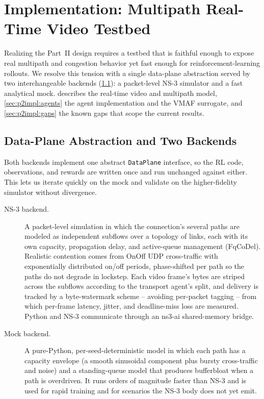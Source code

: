 \chapter{Implementation: Multipath Real-Time Video Testbed}
\label{ch:p2impl}

Realizing the Part~II design requires a testbed that is faithful enough to expose real multipath and
congestion behavior yet fast enough for reinforcement-learning rollouts. We resolve this tension with a
single data-plane abstraction served by two interchangeable backends (\cref{sec:p2impl:dataplane}): a
packet-level NS-3 simulator and a fast analytical mock.  describes the real-time
video and multipath model, \cref{sec:p2impl:agents} the agent implementation and the VMAF surrogate, and
\cref{sec:p2impl:gaps} the known gaps that scope the current results.

\section{Data-Plane Abstraction and Two Backends}
\label{sec:p2impl:dataplane}

Both backends implement one abstract \texttt{DataPlane} interface, so the RL code, observations, and
rewards are written once and run unchanged against either. This lets us iterate quickly on the mock and
validate on the higher-fidelity simulator without divergence.

\begin{description}
  \item[NS-3 backend.] A packet-level simulation in which the connection's several paths are modeled as
  independent subflows over a topology of links, each with its own capacity, propagation delay, and
  active-queue management (FqCoDel). Realistic contention comes from OnOff UDP cross-traffic with
  exponentially distributed on/off periods, phase-shifted per path so the paths do not degrade in
  lockstep. Each video frame's bytes are striped across the subflows according to the transport agent's
  split, and delivery is tracked by a byte-watermark scheme -- avoiding per-packet tagging -- from which
  per-frame latency, jitter, and deadline-miss loss are measured. Python and NS-3 communicate through an
  ns3-ai shared-memory bridge.
  \item[Mock backend.] A pure-Python, per-seed-deterministic model in which each path has a capacity
  envelope (a smooth sinusoidal component plus bursty cross-traffic and noise) and a standing-queue model
  that produces bufferbloat when a path is overdriven. It runs orders of magnitude faster than NS-3 and is
  used for rapid training and for scenarios the NS-3 body does not yet emit.
\end{description}

